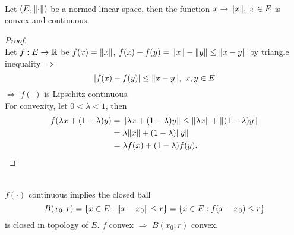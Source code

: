 \vspace{3pt}
\begin{proposition}\ \\
Let $(E, \norm{\cdot})$ be a normed linear space, then the function $x \to \norm{x},\ x \in E$ is convex and continuous. 
\end{proposition}
\clearpage
\begin{proof}\ \\
    Let $f: E \to \mathbb{R}$ be $f(x) = \norm{x}$, $f(x) - f(y) = \norm{x} - \norm{y} \leq \norm{x - y}$ by triangle inequality $\Rightarrow$ 
    \begin{equation*}
        \abs{f(x) - f(y)} \leq \norm{x - y},\ x,y \in E
    \end{equation*}
    $\Rightarrow$ $f(\cdot)$ is \underline{Lipschitz continuous}.\\
    For convexity, let $0 < \lambda < 1$, then
    \begin{align*}
        f(\lambda x + (1 - \lambda)y) &= \norm{\lambda x + (1-\lambda )y} \leq \norm{\lambda x} + \norm{(1 - \lambda)y} \\&= \lambda \norm{x} + (1 - \lambda)\norm{y}\\ &= \lambda f(x) + (1-\lambda) f(y).
    \end{align*}
\end{proof}
\begin{remark}\ \\
$f(\cdot)$ continuous implies the closed ball 
\begin{equation*}
    B(x_0; r) = \{x \in E: \norm{x - x_0} \leq r\} = \{x \in E: f(x - x_0) \leq r\}
\end{equation*} 
is closed in topology of $E$. $f$ convex $\Rightarrow$ $B(x_0;r)$ convex.
\end{remark}
